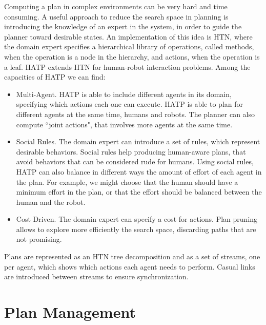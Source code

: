 Computing a plan in complex environments can be very hard and time consuming. A useful approach to reduce the search space in planning is introducing the knowledge of an expert in the system, in order to guide the planner toward desirable states. An implementation of this idea is HTN, where the domain expert specifies a hierarchical library of operations, called methods, when the operation is a node in the hierarchy, and actions, when the operation is a leaf. HATP extends HTN for human-robot interaction problems. Among the capacities of HATP we can find:
\begin{itemize}
\item Multi-Agent. HATP is able to include different agents in its domain, specifying which actions each one can execute. HATP is able to plan for different agents at the same time, humans and robots. The planner can also compute ``joint actions", that involves more agents at the same time.
\item Social Rules. The domain expert can introduce a set of rules, which represent desirable behaviors. Social rules help producing human-aware plans, that avoid behaviors that can be considered rude for humans. Using social rules, HATP can also balance in different ways the amount of effort of each agent in the plan. For example, we might choose that the human should have a minimum effort in the plan, or that the effort should be balanced between the human and the robot.
\item Cost Driven. The domain expert can specify a cost for actions. Plan pruning allows to explore more efficiently the search space, discarding paths that are not promising.
\end{itemize} 

Plans are represented as an HTN tree decomposition and as a set of streams, one per agent, which shows which actions each agent needs to perform. Casual links are introduced between streams to ensure synchronization.

\section{Plan Management}
\label{sec:plan_management-plan_manager}

